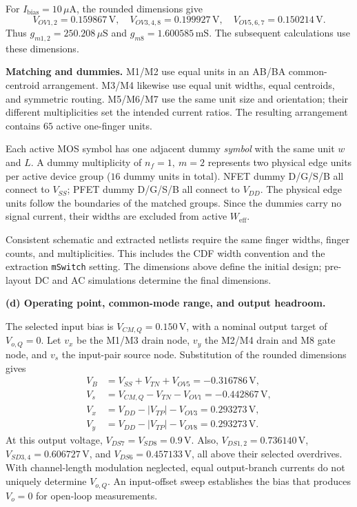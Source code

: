 \documentclass[12pt,letterpaper]{article}
\newcommand{\uA}{\,\mu\mathrm{A}}
\newcommand{\uS}{\,\mu\mathrm{S}}
\newcommand{\mS}{\,\mathrm{mS}}
\newcommand{\V}{\,\mathrm{V}}
\begin{document}
\begin{enumerate}
For $I_{\mathrm{bias}}=10\uA$, the rounded dimensions give
\[
V_{OV1,2}=0.159867\V,\quad
V_{OV3,4,8}=0.199927\V,\quad
V_{OV5,6,7}=0.150214\V.
\]
Thus $g_{m1,2}=250.208\uS$ and $g_{m8}=1.600585\mS$.
The subsequent calculations use these dimensions.

\textbf{Matching and dummies.}
M1/M2 use equal units in an AB/BA common-centroid arrangement.
M3/M4 likewise use equal unit widths, equal centroids, and
symmetric routing. M5/M6/M7 use the same unit size and orientation;
their different multiplicities set the intended current ratios.
The resulting arrangement contains $65$ active one-finger units.

Each active MOS symbol has one adjacent dummy \emph{symbol}
with the same unit $w$ and $L$. A dummy multiplicity of
$n_f=1,\ m=2$ represents two physical edge units per active
device group ($16$ dummy units in total).
NFET dummy D/G/S/B all connect to $V_{SS}$; PFET dummy D/G/S/B
all connect to $V_{DD}$. The physical edge units follow the
boundaries of the matched groups. Since the dummies carry no
signal current, their widths are excluded from active
$W_{\mathrm{eff}}$.

Consistent schematic and extracted netlists require the same
finger widths, finger counts, and multiplicities. This includes
the CDF width convention and the extraction \texttt{mSwitch}
setting. The dimensions above define the initial design;
pre-layout DC and AC simulations determine the final dimensions.

\newpage
\textbf{(d) Operating point, common-mode range, and output headroom.}

The selected input bias is $V_{CM,Q}=0.150\V$, with a nominal
output target of $V_{o,Q}=0$.
Let $v_x$ be the M1/M3 drain node, $v_y$ the M2/M4 drain
and M8 gate node, and $v_s$ the input-pair source node.
Substitution of the rounded dimensions gives
\begin{align*}
V_B&=V_{SS}+V_{TN}+V_{OV5}=-0.316786\V,\\
V_s&=V_{CM,Q}-V_{TN}-V_{OV1}=-0.442867\V,\\
V_x&=V_{DD}-|V_{TP}|-V_{OV3}=0.293273\V,\\
V_y&=V_{DD}-|V_{TP}|-V_{OV8}=0.293273\V.
\end{align*}
At this output voltage, $V_{DS7}=V_{SD8}=0.9\V$.
Also, $V_{DS1,2}=0.736140\V$, $V_{SD3,4}=0.606727\V$,
and $V_{DS6}=0.457133\V$, all above their selected overdrives.
With channel-length modulation neglected, equal output-branch
currents do not uniquely determine $V_{o,Q}$. An input-offset
sweep establishes the bias that produces $V_o=0$ for open-loop
measurements.


\end{enumerate}
\end{document}
